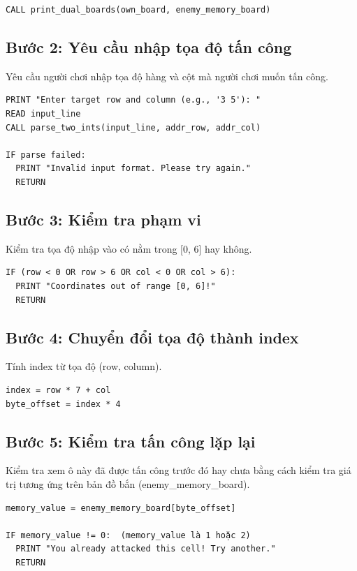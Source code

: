 \begin{verbatim}
CALL print_dual_boards(own_board, enemy_memory_board)
\end{verbatim}

\subsection{Bước 2: Yêu cầu nhập tọa độ tấn công}

Yêu cầu người chơi nhập tọa độ hàng và cột mà người chơi muốn tấn công.

\begin{verbatim}
PRINT "Enter target row and column (e.g., '3 5'): "
READ input_line
CALL parse_two_ints(input_line, addr_row, addr_col)

IF parse failed:
  PRINT "Invalid input format. Please try again."
  RETURN
\end{verbatim}

\subsection{Bước 3: Kiểm tra phạm vi}

Kiểm tra tọa độ nhập vào có nằm trong [0, 6] hay không.

\begin{verbatim}
IF (row < 0 OR row > 6 OR col < 0 OR col > 6):
  PRINT "Coordinates out of range [0, 6]!"
  RETURN
\end{verbatim}

\subsection{Bước 4: Chuyển đổi tọa độ thành index}

Tính index từ tọa độ (row, column).

\begin{verbatim}
index = row * 7 + col
byte_offset = index * 4
\end{verbatim}

\subsection{Bước 5: Kiểm tra tấn công lặp lại}

Kiểm tra xem ô này đã được tấn công trước đó hay chưa bằng cách kiểm tra giá trị tương ứng trên bản đồ bắn (enemy\_memory\_board).

\begin{verbatim}
memory_value = enemy_memory_board[byte_offset]

IF memory_value != 0:  (memory_value là 1 hoặc 2)
  PRINT "You already attacked this cell! Try another."
  RETURN
\end{verbatim}

